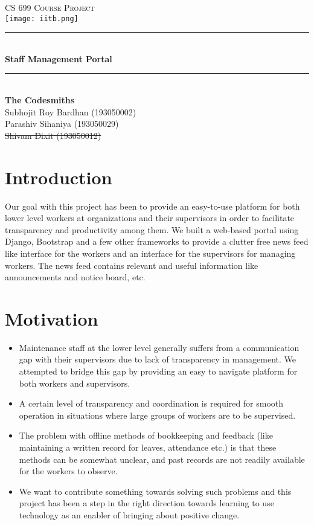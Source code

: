 \documentclass[14pt]{extarticle}
\begin{document}
\begin{titlepage}
\newcommand{\HRule}{\rule{\linewidth}{0.5mm}}
\center
\textsc{\LARGE
CS 699 Course Project
} \\[1cm]
\texttt{[image: iitb.png]} \\[1cm]
\HRule \\[0.4cm]
{ \huge \bfseries Staff Management Portal \\[0.15cm] }
\HRule \\[1.5cm]
{\Large \textbf{The Codesmiths} } \\ [1cm]
Subhojit Roy Bardhan (193050002)
\\[0.2cm]
Parashiv Sihaniya (193050029)
\\[0.2cm]
\st{Shivam Dixit (193050012)}
\\[1cm]

\end{titlepage}

\tableofcontents
\newpage
\section{Introduction}
Our goal with this project has been to provide an easy-to-use platform for both lower level workers at organizations and their supervisors in order to facilitate transparency and productivity among them. We built a web-based portal using Django, Bootstrap and a few other frameworks to provide a clutter free news feed like interface for the workers and an interface for the supervisors for managing workers. The news feed contains relevant and useful information like announcements and notice board, etc.
    
\section{Motivation}
    \begin{itemize}
        \item Maintenance staff at the lower level generally suffers from a communication gap with their supervisors due to lack of transparency in management. We attempted to bridge this gap by providing an easy to navigate platform for both workers and supervisors.
        
        \item A certain level of transparency and coordination is required for smooth
        operation in situations where large groups of workers are to be supervised.
        
        \item The problem with offline methods of bookkeeping and feedback (like
        maintaining a written record for leaves, attendance etc.) is that these methods
        can be somewhat unclear, and past records are not readily available for the
        workers to observe.
        
        \item We want to contribute something towards solving such problems and this project has been a step in the right direction towards learning to use technology as an enabler of bringing about positive change.
    \end{itemize}
\end{document}
